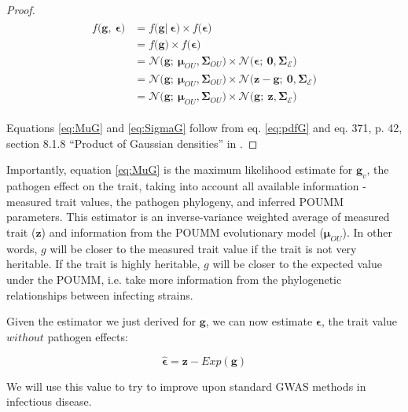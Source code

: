 \documentclass[11pt]{article}
\begin{document}
\begin{linenumbers}
\begin{proof}
	\begin{align}\label{eq:pdfG}
	\begin{split}
		f\big(\bm{g},\ \bm{\epsilon}\big) &= f\big(\bm{g}|\ \bm{\epsilon}\big) \times f\big(\bm{\epsilon}\big) \\
	&= f\big(\bm{g}\big) \times f\big(\bm{\epsilon}\big) \\
	&= \mathcal{N}\big(\bm{g};\ \bm{\mu}_{OU}, \mathbf{\Sigma}_{OU}\big) \times \mathcal{N}\big(\bm{\epsilon};\ \bm{0}, \mathbf{\Sigma}_\mathcal{E}\big) \\
	&= \mathcal{N}\big(\bm{g};\ \bm{\mu}_{OU}, \mathbf{\Sigma}_{OU}\big) \times \mathcal{N}\big(\bm{z} - \bm{g};\ \bm{0}, \mathbf{\Sigma}_\mathcal{E}\big) \\
	&= \mathcal{N}\big(\bm{g};\ \bm{\mu}_{OU}, \mathbf{\Sigma}_{OU}\big) \times \mathcal{N}\big(\bm{g};\ \bm{z}, \mathbf{\Sigma}_\mathcal{E}\big)
	\end{split}
\end{align}
	
	Equations \ref{eq:MuG} and \ref{eq:SigmaG} follow from eq. \ref{eq:pdfG} and eq. 371, p. 42, section 8.1.8 ``Product of Gaussian densities'' in \citet{Petersen2012}.
\end{proof}

Importantly, equation \ref{eq:MuG} is the maximum likelihood estimate for $\bm{g}_v$, the pathogen effect on the trait, taking into account all available information - measured trait values, the pathogen phylogeny, and inferred POUMM parameters. This estimator is an inverse-variance weighted average of measured trait ($\bm{z}$) and information from the POUMM evolutionary model ($\bm{\mu}_{OU}$). In other words, $g$ will be closer to the measured trait value if the trait is not very heritable. If the trait is highly heritable, $g$ will be closer to the expected value under the POUMM, i.e. take more information from the phylogenetic relationships between infecting strains. 

Given the estimator we just derived for $\bm{g}$, we can now estimate $\bm{\epsilon}$, the trait value $without$ pathogen effects: 

\begin{equation}
	\hat{\bm{\epsilon}} = \bm{z} - Exp(\bm{g})
	\label{eq:EHat}
\end{equation}

We will use this value to try to improve upon standard GWAS methods in infectious disease.


\end{linenumbers}
\end{document}
